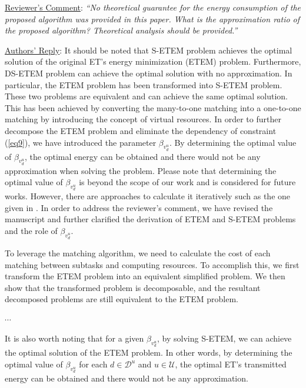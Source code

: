 \documentclass[12pt,draftclsnofoot,onecolumn]{IEEEtran}
\newcommand{\rev}[1]{{\color{blue}#1}} %
\newcommand{\rev}[1]{#1}
\newenvironment{my}[2]%
{\begin{list}{}%
{\setlength{\rightmargin}{#1}\setlength{\leftmargin}{#2}}%


 \item[]{}

} {\end{list}}
\begin{document}
\begin{enumerate}
\item \underline{Reviewer's Comment}: \textit {``No theoretical guarantee for the energy consumption of the proposed algorithm was provided in this paper. What is the approximation ratio of the proposed algorithm? Theoretical analysis should be provided.''\newline}

\underline{Authors' Reply}: 
It should be noted that S-ETEM problem achieves the optimal solution of the original ET's energy minimization (ETEM) problem. Furthermore, DS-ETEM problem can achieve the optimal solution with no approximation. In particular, the ETEM problem has been transformed into S-ETEM problem. These two problems are equivalent and can achieve the same optimal solution. This has been achieved by converting the many-to-one matching into a one-to-one matching by introducing the concept of virtual resources. In order to further decompose the ETEM problem and eliminate the dependency of constraint (\ref{eq9}), we have introduced the parameter $\beta_{v_d^u}$. By determining the optimal value of $\beta_{v_d^u}$, the optimal energy can be obtained and there would not be any approximation when solving the problem. Please note that determining the optimal value of $\beta_{v_d^u}$ is beyond the scope of our work and is considered for future works. However, there are approaches to calculate it iteratively such as the one given in \cite{b2}. In order to address the reviewer's comment, we have revised the manuscript and further clarified the derivation of ETEM and S-ETEM problems and the role of $\beta_{v_d^u}$.\\

\begin{my}{1cm}{1cm}
	\rev{
	To leverage the matching algorithm, we need to calculate the cost of each matching between subtasks and computing resources. To accomplish this, we first transform the ETEM problem into an equivalent simplified problem. We then show that the transformed problem is decomposable, and the resultant decomposed problems are still equivalent to the ETEM problem. \newline

	$\cdots$
	
	It is also worth noting that for a given $\beta_{v_d^u}$, by solving S-ETEM, we can achieve the optimal solution of the ETEM problem. In other words, by determining the optimal value of $\beta_{v_d^u}$ for each $d\in\mathcal{D}^u$ and $u\in\mathcal{U}$, the optimal ET's transmitted energy can be obtained and there would not be any approximation.\\
}
\end{my}


\end{enumerate}
\end{document}
